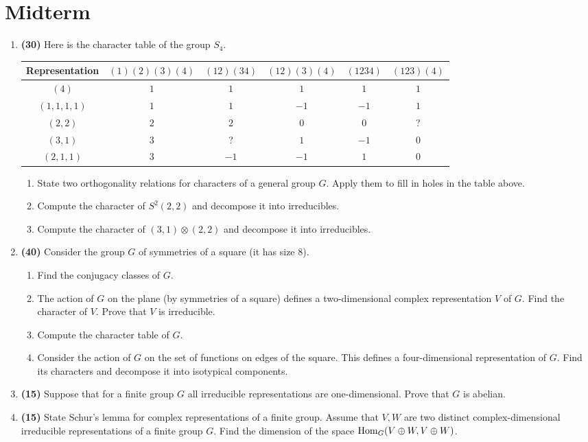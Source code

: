 \documentclass[../notes.tex]{subfiles}
\begin{document}
\section{Midterm}
\begin{enumerate}
    \item \textbf{(30)} Here is the character table of the group $S_4$.
    \begin{center}
        \begin{tabular}{||cccccc||}
            \hline
            Representation & $(1)(2)(3)(4)$ & $(12)(34)$ & $(12)(3)(4)$ & $(1234)$ & $(123)(4)$\\
            \hline\hline
            $(4)$       & $1$ & $1$  & $1$  & $1$  & $1$\\ \hline
            $(1,1,1,1)$ & $1$ & $1$  & $-1$ & $-1$ & $1$\\ \hline
            $(2,2)$     & $2$ & $2$  & $0$  & $0$  & ?  \\ \hline
            $(3,1)$     & $3$ & ?    & $1$  & $-1$ & $0$\\ \hline
            $(2,1,1)$   & $3$ & $-1$ & $-1$ & $1$  & $0$\\ \hline
        \end{tabular}
    \end{center}
    \begin{enumerate}
        \item State two orthogonality relations for characters of a general group $G$. Apply them to fill in holes in the table above.
        \item Compute the character of $S^2(2,2)$ and decompose it into irreducibles.
        \item Compute the character of $(3,1)\otimes(2,2)$ and decompose it into irreducibles.
    \end{enumerate}
    \item \textbf{(40)} Consider the group $G$ of symmetries of a square (it has size 8).
    \begin{enumerate}
        \item Find the conjugacy classes of $G$.
        \item The action of $G$ on the plane (by symmetries of a square) defines a two-dimensional complex representation $V$ of $G$. Find the character of $V$. Prove that $V$ is irreducible.
        \item Compute the character table of $G$.
        \item Consider the action of $G$ on the set of functions on edges of the square. This defines a four-dimensional representation of $G$. Find its characters and decompose it into isotypical components.
    \end{enumerate}
    \item \textbf{(15)} Suppose that for a finite group $G$ all irreducible representations are one-dimensional. Prove that $G$ is abelian.
    \item \textbf{(15)} State Schur's lemma for complex representations of a finite group. Assume that $V,W$ are two distinct complex-dimensional irreducible representations of a finite group $G$. Find the dimension of the space $\operatorname{Hom}_G(V\oplus W,V\oplus W)$.
\end{enumerate}
\end{document}
